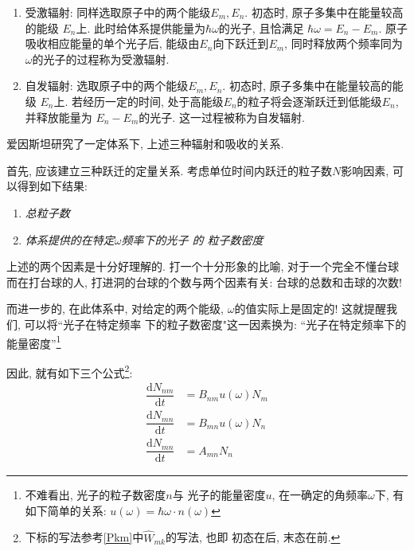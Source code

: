 \documentclass[a4paper, 11pt]{article}
\begin{document}
\begin{spacing}{1.2}
\begin{enumerate}[*]
            \item 受激辐射: 同样选取原子中的两个能级$E_m, E_n$. 初态时, 原子多集中在能量较高的能级
            $E_n$上. 此时给体系提供能量为$\hbar\omega$的光子, 且恰满足
            $\hbar\omega=E_n-E_m$. 原子吸收相应能量的单个光子后, 能级由$E_n$向下跃迁到$E_m$, 
            同时释放两个频率同为$\omega$的光子的过程称为受激辐射.
      
            \item 自发辐射: 选取原子中的两个能级$E_m, E_n$. 初态时, 原子多集中在能量较高的能级
            $E_n$上. 若经历一定的时间, 处于高能级$E_n$的粒子将会逐渐跃迁到低能级$E_n$, 并释放能量为
            $E_n-E_m$的光子. 这一过程被称为自发辐射.
          \end{enumerate}

          爱因斯坦研究了一定体系下, 上述三种辐射和吸收的关系.
          
          首先, 应该建立三种跃迁的定量关系. 考虑单位时间内跃迁的粒子数$N$影响因素, 可以得到如下结果:
          \begin{enumerate}[*]
            \item \emph{总粒子数}
            \item \emph{体系提供的在特定$\omega$频率下的光子 的 粒子数密度}
          \end{enumerate}
          
          上述的两个因素是十分好理解的. 打一个十分形象的比喻, 对于一个完全不懂台球而在打台球的人, 
          打进洞的台球的个数与两个因素有关: 台球的总数和击球的次数!

          而进一步的, 在此体系中, 对给定的两个能级, $\omega$的值实际上是固定的! 这就提醒我们, 
          可以将``光子在特定频率
          下的粒子数密度"这一因素换为: ``光子在特定频率下的能量密度''\footnote{不难看出, 
          光子的粒子数密度$n$与
          光子的能量密度$u$, 在一确定的角频率$\omega$下, 有如下简单的关系: $u(\omega) = 
          \hbar\omega\cdot n(\omega)$}

          因此, 就有如下三个公式\footnote{下标的写法参考\eqref{Pkm}中$\hat{W}_{mk}$的写法, 也即
          初态在后, 末态在前.}:
          \begin{subequations}
            \label{NABC}
            \begin{align}
              \dfrac{\mathrm{d}N_{nm}}{\mathrm{d}t} &= B_{nm}u(\omega)N_m \\
              \dfrac{\mathrm{d}N_{mn}}{\mathrm{d}t} &= B_{mn}u(\omega)N_n \\
              \dfrac{\mathrm{d}N_{mn}}{\mathrm{d}t} &= A_{mn}N_n
            \end{align}
          \end{subequations}


\end{spacing}
\end{document}
